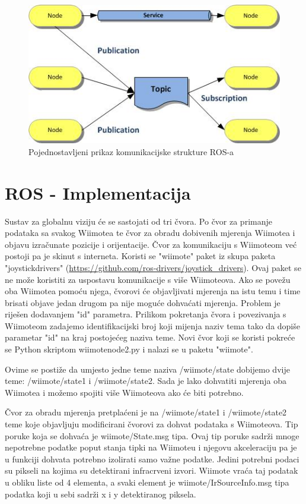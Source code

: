 \documentclass[times, utf8, diplomski]{fer}
\begin{document}
\begin{figure}[h]
\centering
\includegraphics[width=.7\textwidth]{ros_struktura}
\caption{Pojednostavljeni prikaz komunikacijske strukture ROS-a}
\label{fig:struktura}
\end{figure}

\section{ROS - Implementacija}
Sustav za globalnu viziju će se sastojati od tri čvora. Po čvor za primanje podataka sa svakog Wiimotea te čvor za obradu dobivenih mjerenja Wiimotea i objavu izračunate pozicije i orijentacije. Čvor za komunikaciju s Wiimoteom već postoji pa je skinut s interneta. Koristi se "wiimote" paket iz skupa paketa "joystick\textunderscore drivers" (\url{https://github.com/ros-drivers/joystick_drivers}). Ovaj paket se ne može koristiti za uspostavu komunikacije s više Wiimoteova. Ako se povežu oba Wiimotea pomoću njega, čvorovi će objavljivati mjerenja na istu temu i time brisati objave jedan drugom pa nije moguće dohvaćati mjerenja. Problem je riješen dodavanjem "id" parametra. Prilikom pokretanja čvora i povezivanja s Wiimoteom zadajemo identifikacijski broj koji mijenja naziv tema tako da dopiše parametar "id" na kraj postojećeg naziva teme. Novi čvor koji se koristi pokreće se Python skriptom wiimote\textunderscore node2.py i nalazi se u paketu "wiimote".

Ovime se postiže da umjesto jedne teme naziva /wiimote/state dobijemo dvije teme: /wiimote/state1 i /wiimote/state2. Sada je lako dohvatiti mjerenja oba Wiimotea i možemo spojiti više Wiimoteova ako će biti potrebno.

Čvor za obradu mjerenja pretplaćeni je na /wiimote/state1 i /wiimote/state2 teme koje objavljuju modificirani čvorovi za dohvat podataka s Wiimoteova. Tip poruke koja se dohvaća je wiimote/State.msg tipa. Ovaj tip poruke sadrži mnoge nepotrebne podatke poput stanja tipki na Wiimoteu i njegovu akceleraciju pa je u funkciji dohvata potrebno izolirati samo važne podatke. Jedini potrebni podaci su pikseli na kojima su detektirani infracrveni izvori. Wiimote vraća taj podatak u obliku liste od 4 elementa, a svaki element je wiimote/IrSourceInfo.msg tipa podatka koji u sebi sadrži x i y detektiranog piksela.
\end{document}
